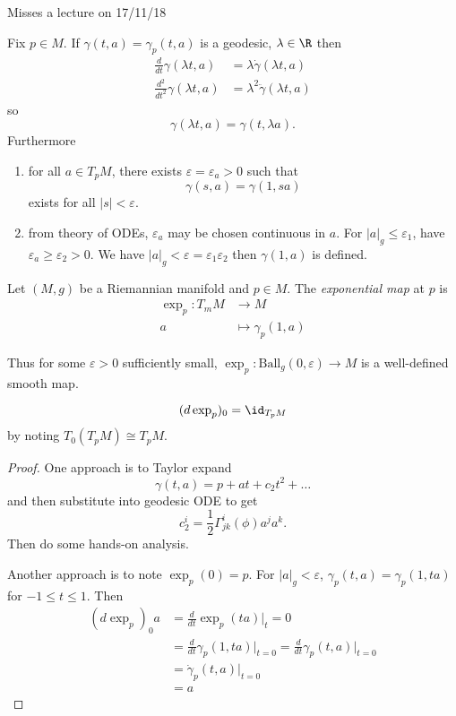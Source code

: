 \documentclass[a4paper]{article}
\begin{document}
Misses a lecture on 17/11/18

Fix \(p \in M\). If \(\gamma(t, a) = \gamma_p(t, a)\) is a geodesic, \(\lambda \in \R\) then
\begin{align*}
  \frac{d}{dt} \gamma(\lambda t, a) &= \lambda \dot \gamma(\lambda t, a) \\
  \frac{d^2}{dt^2} \gamma(\lambda t, a) &= \lambda^2 \ddot \gamma(\lambda t, a)
\end{align*}
so
\[
  \gamma(\lambda t, a) = \gamma(t, \lambda a).
\]
Furthermore
\begin{enumerate}
\item for all \(a \in T_pM\), there exists \(\varepsilon = \varepsilon_a > 0\) such that
  \[
    \gamma(s, a) = \gamma(1, sa)
  \]
  exists for all \(|s| < \varepsilon\).
\item from theory of ODEs, \(\varepsilon_a\) may be chosen continuous in \(a\). For \(|a|_g \leq \varepsilon_1\), have \(\varepsilon_a \geq \varepsilon_2 > 0\). We have \(|a|_g < \varepsilon = \varepsilon_1 \varepsilon_2\) then \(\gamma(1, a)\) is defined.
\end{enumerate}

\begin{definition}
  Let \((M, g)\) be a Riemannian manifold and \(p \in M\). The \emph{exponential map} at \(p\) is
  \begin{align*}
    \exp_p: T_m M &\to M \\
    a &\mapsto \gamma_p(1, a)
  \end{align*}
\end{definition}
Thus for some \(\varepsilon > 0\) sufficiently small, \(\exp_p: \text{Ball}_g(0, \varepsilon) \to M\) is a well-defined smooth map.

\begin{proposition}
  \[
    (d \exp_p)_0 = \id_{T_pM}
  \]
  by noting \(T_0(T_pM) \cong T_pM\).
\end{proposition}

\begin{proof}
  One approach is to Taylor expand
  \[
    \gamma(t, a) = p + at + c_2 t^2 + \dots
  \]
  and then substitute into geodesic ODE to get
  \[
    c_2^i = \frac{1}{2} \Gamma_{jk}^i (\phi) a^ja^k.
  \]
  Then do some hands-on analysis.

  Another approach is to note \(\exp_p(0) = p\). For \(|a|_g < \varepsilon\), \(\gamma_p(t, a) = \gamma_p(1, ta)\) for \(-1 \leq t \leq 1\). Then
  \begin{align*}
    (d \exp_p)_0 a
    &= \frac{d}{dt} \exp_p(t a) \Big|_t = 0 \\
    &= \frac{d}{dt} \gamma_p(1, ta) \Big|_{t = 0}
      = \frac{d}{dt} \gamma_p (t, a) \Big|_{t = 0} \\
    &= \dot \gamma_p(t, a) \Big|_{t = 0} \\
    &= a
  \end{align*}
\end{proof}
\end{document}
